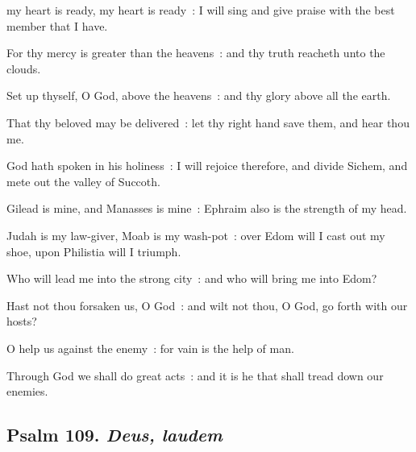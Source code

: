  my heart is ready, my heart is ready~: I will sing and give praise with the best member that I have.\par
{}
For thy mercy is greater than the heavens~: and thy truth reacheth unto the clouds.\par
{}Set up thyself, O God, above the heavens~: and thy glory above all the earth.\par
{}That thy beloved may be delivered~: let thy right hand save them, and hear thou me.\par
{}God hath spoken in his holiness~: I will rejoice therefore, and divide Sichem, and mete out the valley of Succoth.\par
{}Gilead is mine, and Manasses is mine~: Ephraim also is the strength of my head.\par
{}Judah is my law-giver, Moab is my wash-pot~: over Edom will I cast out my shoe, upon Philistia will I triumph.\par
{}Who will lead me into the strong city~: and who will bring me into Edom?\par
{}Hast not thou forsaken us, O God~: and wilt not thou, O God, go forth with our hosts?\par
{}O help us against the enemy~: for vain is the help of man.\par
{}Through God we shall do great acts~: and it is he that shall tread down our enemies.\par

\subsection{Psalm 109. \textit{Deus, laudem}}


